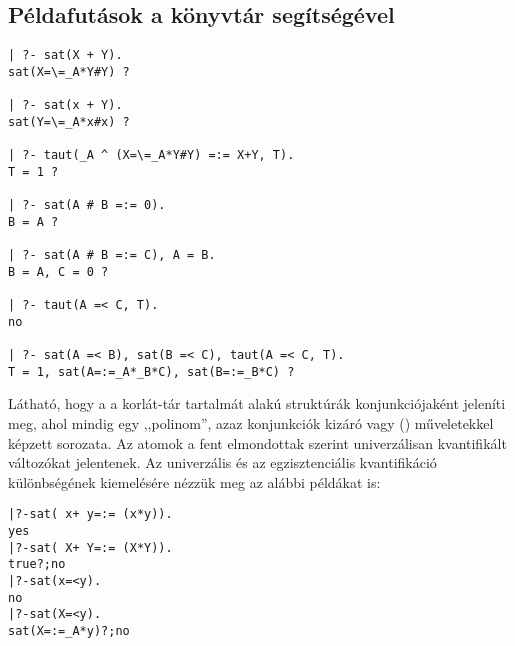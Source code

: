 
\subsection{Példafutások a \clpb könyvtár segítségével}

\begin{verbatim}
| ?- sat(X + Y).
sat(X=\=_A*Y#Y) ? 

| ?- sat(x + Y).
sat(Y=\=_A*x#x) ? 

| ?- taut(_A ^ (X=\=_A*Y#Y) =:= X+Y, T).
T = 1 ? 

| ?- sat(A # B =:= 0).
B = A ? 

| ?- sat(A # B =:= C), A = B.
B = A, C = 0 ? 

| ?- taut(A =< C, T).
no

| ?- sat(A =< B), sat(B =< C), taut(A =< C, T).
T = 1, sat(A=:=_A*_B*C), sat(B=:=_B*C) ? 
\end{verbatim}

Látható, hogy a \clpb a korlát-tár tartalmát  alakú
struktúrák konjunkciójaként jeleníti meg, ahol  mindig egy
,,polinom'', azaz konjunkciók kizáró vagy (\cd{\#}) műveletekkel képzett
sorozata. Az atomok a fent elmondottak szerint univerzálisan kvantifikált
változókat jelentenek. Az univerzális és az egzisztenciális kvantifikáció
különbségének kiemelésére nézzük meg az alábbi példákat is:

\begin{alltt}
| ?- sat(~x+ ~y=:= ~(x*y)).   % \(\forall\cd{xy}(\lnot\cd{x}\lor\lnot\cd{y}=\lnot(\cd{x}\land\cd{y}))\)
yes
| ?- sat(~X+ ~Y=:= ~(X*Y)).   % \(\exists?\cd{XY}(\lnot\cd{X}\lor\lnot\cd{Y}=\lnot(\cd{X}\land\cd{Y}))\)
true ? ; no
| ?- sat(x=<y).               % \(\forall\cd{xy}(\cd{x} \to \cd{y})\)
no
| ?- sat(X=<y).               % \(\forall\cd{y}\exists?\cd{X}(\cd{X} \to \cd{y})\) 
sat(X=:=_A*y) ? ; no
\end{alltt}

